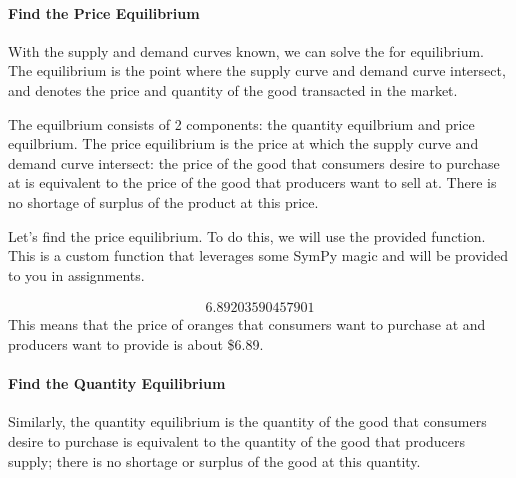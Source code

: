 \documentclass[letterpaper,10pt,english]{jupyterBook}
\begin{document}
\paragraph{Find the Price Equilibrium}
\label{\detokenize{content/02-supply/03-market-equilibria:find-the-price-equilibrium}}
\sphinxAtStartPar
With the supply and demand curves known, we can solve the for equilibrium.
The equilibrium is the point where the supply curve and demand curve intersect, and denotes the price and quantity of the good transacted in the market.

\sphinxAtStartPar
The equilbrium consists of 2 components: the quantity equilbrium and price equilbrium.
The price equilibrium is the price at which the supply curve and demand curve intersect: the price of the good that consumers desire to purchase at is equivalent to the price of the good that producers want to sell at. There is no shortage of surplus of the product at this price.

\sphinxAtStartPar
Let’s find the price equilibrium. To do this, we will use the provided  function. This is a custom function that leverages some SymPy magic and will be provided to you in assignments.

\begin{sphinxVerbatim}[commandchars=\\\{\}]
   
\end{sphinxVerbatim}
\begin{equation*}
\begin{split}\displaystyle 6.89203590457901\end{split}
\end{equation*}
\sphinxAtStartPar
This means that the price of oranges that consumers want to purchase at and producers want to provide is about \$6.89.


\paragraph{Find the Quantity Equilibrium}
\label{\detokenize{content/02-supply/03-market-equilibria:find-the-quantity-equilibrium}}
\sphinxAtStartPar
Similarly, the quantity equilibrium is the quantity of the good that consumers desire to purchase is equivalent to the quantity of the good that producers supply; there is no shortage or surplus of the good at this quantity.
\end{document}
